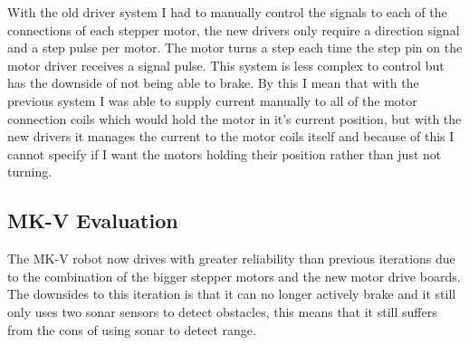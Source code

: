 With the old driver system I had to manually control the signals to each of the connections of each stepper motor, the new drivers only require a direction signal and a step pulse per motor.  The motor turns a step each time the step pin on the motor driver receives a signal pulse.  This system is less complex to control but has the downside of not being able to brake.  By this I mean that with the previous system I was able to supply current manually to all of the motor connection coils which would hold the motor in it's current position, but with the new drivers it manages the current to the motor coils itself and because of this I cannot specify if I want the motors holding their position rather than just not turning.
\subsection{MK-V Evaluation}
The MK-V robot now drives with greater reliability than previous iterations due to the combination of the bigger stepper motors and the new motor drive boards.
\\The downsides to this iteration is that it can no longer actively brake and it still only uses two sonar sensors to detect obstacles, this means that it still suffers from the cons of using sonar to detect range.

